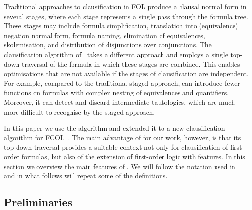 
%
%

Traditional approaches to
clausification in FOL \cite{nonnengart2001computing,Vampire13} produce a clausal normal
form in several stages, where each stage
represents a single pass through the formula tree. These stages may include formula simplification, translation into (equivalence) negation normal form,
formula naming, elimination of equivalences, skolemisation, and distribution of
disjunctions over conjunctions. The \newcnf{} clausification algorithm
of~\cite{newcnf_fol} takes a different approach and employs a single top-down
traversal of the formula in which these stages are combined.  
This enables optimisations that are not available if the stages of clausification are independent. For example, compared to the traditional staged approach, \newcnf{} can introduce fewer \Skolem{} functions on formulas with complex nesting of equivalences and quantifiers. Moreover, it can detect and discard intermediate tautologies, 
which are much more difficult to recognise by the staged approach.
%
%

In this paper we use the \newcnf{} algorithm and extended it to a new clausification algorithm for FOOL~\cite{FOOL}. 
The main advantage of \newcnf{} for our work, however, is that its top-down
traversal provides a suitable context not only for clausification of first-order
formulas, but also of the extension of first-order logic with \folb{}
features. In this section we overview the main features of \newcnf{}. We will follow the notation used in~\cite{newcnf_fol} and in what follows will repeat some of the definitions. 

\subsection{Preliminaries}

